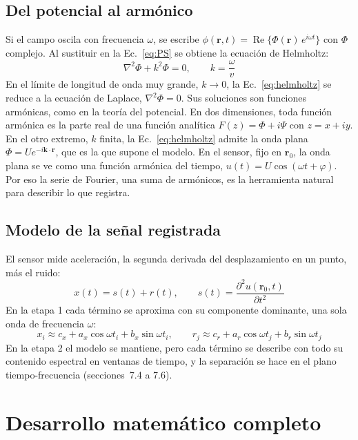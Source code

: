 \documentclass[11pt,letterpaper]{article}
\begin{document}
\subsection{Del potencial al armónico}
Si el campo oscila con frecuencia $\omega$, se escribe $\phi(\mathbf r,t) = \operatorname{Re}\{\Phi(\mathbf r)\,e^{i\omega t}\}$ con $\Phi$ complejo. Al sustituir en la Ec.~\eqref{eq:PS} se obtiene la ecuación de Helmholtz:
\begin{equation}
\nabla^2\Phi + k^2\Phi = 0, \qquad k = \frac{\omega}{v}
\label{eq:helmholtz}
\end{equation}
En el límite de longitud de onda muy grande, $k \to 0$, la Ec.~\eqref{eq:helmholtz} se reduce a la ecuación de Laplace, $\nabla^2\Phi = 0$. Sus soluciones son funciones armónicas, como en la teoría del potencial. En dos dimensiones, toda función armónica es la parte real de una función analítica $F(z) = \Phi + i\Psi$ con $z = x + iy$. En el otro extremo, $k$ finita, la Ec.~\eqref{eq:helmholtz} admite la onda plana $\Phi = U e^{-i\mathbf k\cdot\mathbf r}$, que es la que supone el modelo. En el sensor, fijo en $\mathbf r_0$, la onda plana se ve como una función armónica del tiempo, $u(t) = U\cos(\omega t + \varphi)$. Por eso la serie de Fourier, una suma de armónicos, es la herramienta natural para describir lo que registra.

\subsection{Modelo de la señal registrada}
El sensor mide aceleración, la segunda derivada del desplazamiento en un punto, más el ruido:
\begin{equation}
x(t) = s(t) + r(t), \qquad s(t) = \frac{\partial^2 u(\mathbf r_0, t)}{\partial t^2}
\label{eq:balance}
\end{equation}
En la etapa 1 cada término se aproxima con su componente dominante, una sola onda de frecuencia $\omega$:
\begin{equation}
x_i \approx c_x + a_x\cos\omega t_i + b_x\sin\omega t_i, \qquad r_j \approx c_r + a_r\cos\omega t_j + b_r\sin\omega t_j
\label{eq:modelo}
\end{equation}
En la etapa 2 el modelo se mantiene, pero cada término se describe con todo su contenido espectral en ventanas de tiempo, y la separación se hace en el plano tiempo-frecuencia (secciones~7.4 a 7.6).

\section{Desarrollo matemático completo}
\end{document}
